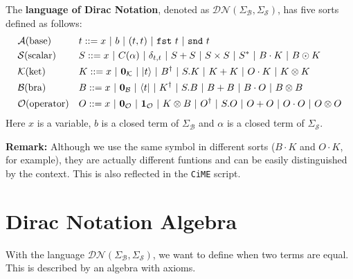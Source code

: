 \begin{definition}
  The \textbf{language of Dirac Notation}, denoted as $\mathcal{DN}(\Sigma_\mathcal{B}, \Sigma_\mathcal{S})$, has five sorts defined as follows:
  \begin{align*}
    & \mathcal{A} \textrm{(base)} && t ::= x\ |\ b\ |\ (t, t)\ |\ \fst\ t\ |\ \snd\ t \\
    & \mathcal{S} \textrm{(scalar)} && S ::= x\ |\ C(\alpha)\ |\ \delta_{t, t}\ |\ S + S\ |\ S \times S\ |\ S^*\ |\ B \cdot K\ |\ B \odot K \\
    & \mathcal{K} \textrm{(ket)} && K ::= x\ |\ \mathbf{0}_\mathcal{K}\ |\ \ket{t}\ |\ B^\dagger\ |\ S.K\ |\ K + K\ |\ O \cdot K\ |\ K \otimes K \\
    & \mathcal{B} \textrm{(bra)} && B ::= x\ |\ \mathbf{0}_\mathcal{B}\ |\ \bra{t}\ |\ K^\dagger\ |\ S.B\ |\ B + B\ |\ B \cdot O\ |\ B \otimes B \\
    & \mathcal{O} \textrm{(operator)} && O ::= x\ |\ \mathbf{0}_\mathcal{O}\ |\ \mathbf{1}_\mathcal{O}\ |\ K \otimes B\ |\ O^\dagger\ |\ S.O\ |\ O + O\ |\ O \cdot O\ |\ O \otimes O
  \end{align*}
  Here $x$ is a variable, $b$ is a closed term of $\Sigma_\mathcal{B}$ and $\alpha$ is a closed term of $\Sigma_\mathcal{S}$.

\end{definition}

\textbf{Remark: } Although we use the same symbol in different sorts ($B \cdot K$ and $O \cdot K$, for example), they are actually different funtions and can be easily distinguished by the context. This is also reflected in the \texttt{CiME} script.




\section{Dirac Notation Algebra}

With the language $\mathcal{DN}(\Sigma_\mathcal{B}, \Sigma_\mathcal{S})$, we want to define when two terms are equal. This is described by an algebra with axioms.


